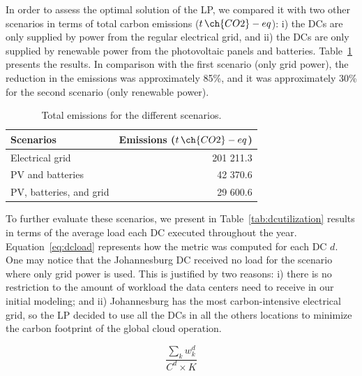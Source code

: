 In order to assess the optimal solution of the LP, we compared it with two other scenarios in terms of total carbon emissions ($t\,\ch{CO2}-eq$): i) the DCs are only supplied by power from the regular electrical grid, and ii) the DCs are only supplied by renewable power from the photovoltaic panels and batteries. Table~\ref{tab:emissions} presents the results. In comparison with the first scenario (only grid power), the reduction in the  emissions was approximately 85\%, and it was approximately 30\% for the second scenario (only renewable power).


\begin{table}[!ht]
\caption{Total emissions for the different scenarios.}\label{tab:emissions} \centering
\begin{tabular}{|p{5cm}|r|}
  \hline
  \textbf{Scenarios} & \textbf{Emissions ($t\,\ch{CO2}-eq$)}   \\
  \hline
  Electrical grid                    & 201 211.3    \\
  \hline
  PV and batteries  &                  42 370.6 \\ 
  \hline
  PV, batteries, and grid            &  29 600.6   \\
  \hline


\end{tabular}
\end{table}

To further evaluate these scenarios, we present in Table~\ref{tab:dcutilization} results in terms of the average load each DC executed throughout the year. Equation~\eqref{eq:dcload} represents how the metric was computed for each DC $d$. One may notice that the Johannesburg DC received no load for the scenario where only grid power is used. This is justified by two reasons: i) there is no restriction to the amount of workload the data centers need to receive in our initial modeling; and ii) Johannesburg has the most carbon-intensive electrical grid, so the LP decided to use all the DCs in all the others locations to minimize the carbon footprint of the global cloud operation.

\begin{equation}\label{eq:dcload}
\frac{\sum_k w^d_k} {C^d \times K }
\end{equation}


